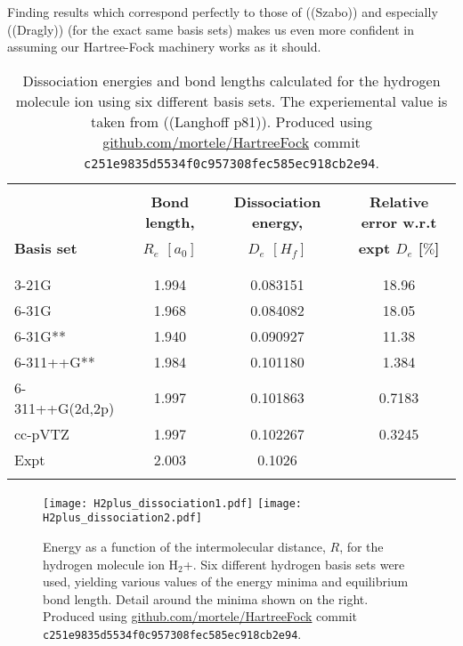 \documentclass[a4paper]{article}
\begin{document}
Finding results which correspond perfectly to those of ((Szabo)) and especially ((Dragly)) (for the exact same basis sets) makes us even more confident in assuming our Hartree-Fock machinery works as it should. 









\begin{table}
\setlength\extrarowheight{2pt}
\begin{tabularx}{\textwidth}{X *{3}{S[table-format=-1.3,table-space-text-post=***]}}
\hline
\hline
\\[-0.9em]
& \textbf{Bond length,}& \textbf{Dissociation energy,} & \textbf{Relative error w.r.t} 
\\
\textbf{Basis set} & \textbf{\phantom{----.}$R_e$ $[a_0]$} & \textbf{\phantom{---------.}$D_e$ $[H_f]$} & \textbf{\phantom{------}expt $D_e$ [$\%$]} 
\\
\\[-0.9em]
\hline
\\[-0.9em]
3-21G           & 1.994 & 0.083151 & 18.96        \\
6-31G           & 1.968 & 0.084082 & 18.05        \\
6-31G**         & 1.940 & 0.090927 & 11.38        \\
6-311++G**      & 1.984 & 0.101180 & 1.384        \\
6-311++G(2d,2p) & 1.997 & 0.101863 & 0.7183       \\
cc-pVTZ         & 1.997 & 0.102267 & 0.3245       \\
Expt            & 2.003 & 0.1026   &              \\ 
\\[-0.9em]
\hline
\end{tabularx}
\caption{Dissociation energies and bond lengths calculated for the hydrogen molecule ion  using six different basis sets. The experiemental value is taken from  ((Langhoff p81)). Produced using \url{github.com/mortele/HartreeFock} commit \texttt{c251e9835d5534f0c957308fec585ec918cb2e94}. \label{tab:hfv4}}
\end{table}




\begin{figure}
\centering
\texttt{[image: H2plus\_dissociation1.pdf]}
\texttt{[image: H2plus\_dissociation2.pdf]}
\caption{Energy as a function of the intermolecular distance, $R$, for the hydrogen molecule ion H${}_2$+. Six different hydrogen basis sets were used, yielding various values of the energy minima and equilibrium bond length. Detail around the minima shown on the right. Produced using \url{github.com/mortele/HartreeFock} commit \texttt{c251e9835d5534f0c957308fec585ec918cb2e94}. \label{fig:h2plus_dissociation}}
\end{figure}
\end{document}
